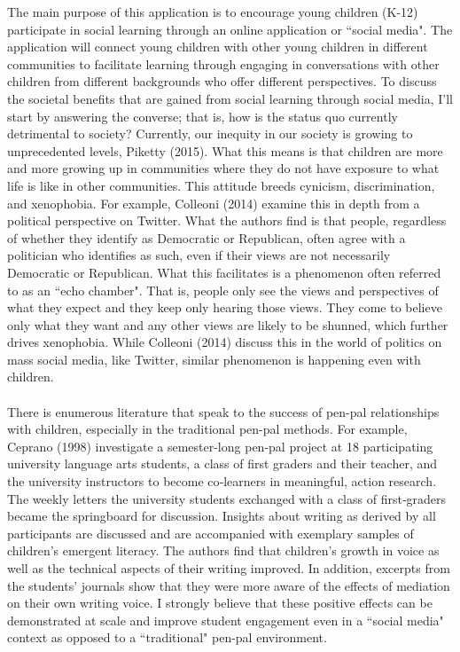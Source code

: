 \documentclass[12pt, final]{article}
\begin{document}
The main purpose of this application is to encourage young children (K-12) participate in social learning through an online application or ``social media". The application will connect young children with other young children in different communities to facilitate learning through engaging in conversations with other children from different backgrounds who offer different perspectives. To discuss the societal benefits that are gained from social learning through social media, I'll start by answering the converse; that is, how is the status quo currently detrimental to society? Currently, our inequity in our society is growing to unprecedented levels, Piketty (2015). What this means is that children are more and more growing up in communities where they do not have exposure to what life is like in other communities. This attitude breeds cynicism, discrimination, and xenophobia. For example, Colleoni (2014) examine this in depth from a political perspective on Twitter. What the authors find is that people, regardless of whether they identify as Democratic or Republican, often agree with a politician who identifies as such, even if their views are not necessarily Democratic or Republican. What this facilitates is a phenomenon often referred to as an ``echo chamber". That is, people only see the views and perspectives of what they expect and they keep only hearing those views. They come to believe only what they want and any other views are likely to be shunned, which further drives xenophobia. While Colleoni (2014) discuss this in the world of politics on mass social media, like Twitter, similar phenomenon is happening even with children. 
\\
\\
There is enumerous literature that speak to the success of pen-pal relationships with children, especially in the traditional pen-pal methods. For example, Ceprano (1998) investigate a semester-long pen-pal project at 18 participating university language arts students, a class of first graders and their teacher, and the university instructors to become co‐learners in meaningful, action research. The weekly letters the university students exchanged with a class of first‐graders became the springboard for discussion. Insights about writing as derived by all participants are discussed and are accompanied with exemplary samples of children's emergent literacy. The authors find that children's growth in voice as well as the technical aspects of their writing improved. In addition, excerpts from the students' journals show that they were more aware of the effects of mediation on their own writing voice. I strongly believe that these positive effects can be demonstrated at scale and improve student engagement even in a ``social media" context as opposed to a ``traditional" pen-pal environment. 
\end{document}
